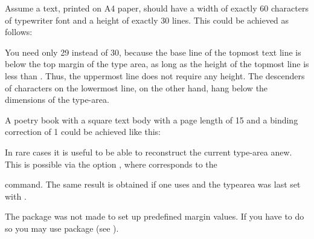 \begin{Example}
  Assume a text, printed on A4 paper, should have a width of exactly 60
  characters of typewriter font and a height of exactly 30 lines. This could
  be achieved as follows:
You need only 29 instead of 30, because the base line of the topmost
text line is  below the top margin of the type area, as
long as the height of the topmost line is less than
. Thus, the uppermost line does not require any
height. The descenders of characters on the lowermost line, on the
other hand, hang below the dimensions of the type-area.

\item A poetry book with a square text body with a page length of
  15 and a binding correction of 1 could be
  achieved like this:
\end{Example}

%
\begin{Declaration}
\end{Declaration}%
In rare cases it is useful to be
able to reconstruct the current type-area anew. This is possible via
the option , where
 corresponds to the 
\begin{lstcode}[belowskip=\dp\strutbox]
  \areaset[current]{\textwidth}{\textheight}
\end{lstcode}
command. The same result is obtained if one uses
 and the typearea was last set with
.%
%
%

The  package was not made to set up predefined
margin values. If you have to do so you may use package
 (see
\cite{package:geometry}).



